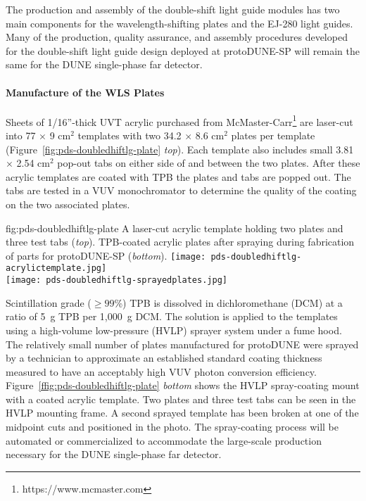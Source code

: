 The production and assembly of the double-shift light guide modules has two main components for the wavelength-shifting plates and the EJ-280 light guides. Many of the production, quality assurance, and assembly procedures developed for the double-shift light guide design deployed at protoDUNE-SP will remain the same for the DUNE single-phase far detector.
																								
\paragraph*{Manufacture of the WLS Plates}

Sheets of 1/16''-thick UVT acrylic purchased from McMaster-Carr\footnote{https://www.mcmaster.com} are laser-cut into 77 $\times$ 9 cm$^2$ templates with two 34.2 $\times$ 8.6 cm$^2$ plates per template (Figure~\ref{fig:pds-doubledhiftlg-plate} {\it top}). Each template also includes small 3.81 $\times$ 2.54 cm$^2$ pop-out tabs on either side of and between the two plates. After these acrylic templates are coated with TPB the plates and tabs are popped out. The tabs are tested in a VUV monochromator to determine the quality of the coating on the two associated plates.

\begin{dunefigure}
{fig:pds-doubledhiftlg-plate}
{A laser-cut acrylic template holding two plates and three test tabs ({\it top}). TPB-coated acrylic plates after spraying during fabrication of parts for protoDUNE-SP ({\it bottom}).}
    \texttt{[image: pds-doubledhiftlg-acrylictemplate.jpg]}\\
    \texttt{[image: pds-doubledhiftlg-sprayedplates.jpg]}
\end{dunefigure}

Scintillation grade ($\ge 99$\%) TPB is dissolved in dichloromethane (DCM) at a ratio of 5~g TPB per 1,000~g DCM. The solution is applied to the templates using a high-volume low-pressure (HVLP) sprayer system under a fume hood. The relatively small number of plates manufactured for protoDUNE were sprayed by a technician to approximate an established standard coating thickness measured to have an acceptably high VUV photon conversion efficiency. Figure~\ref{ffig:pds-doubledhiftlg-plate} {\it bottom} shows the HVLP spray-coating mount with a coated acrylic template. Two plates and three test tabs can be seen in the HVLP mounting frame. A second sprayed template has been broken at one of the midpoint cuts and positioned in the photo. The spray-coating process will be automated or commercialized to accommodate the large-scale production necessary for the DUNE single-phase far detector.

